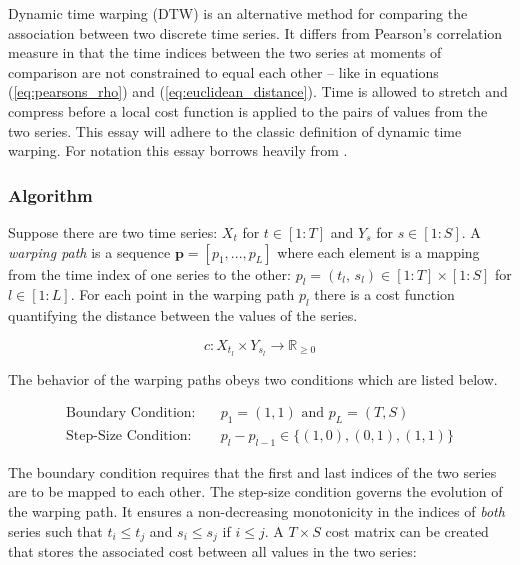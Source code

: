 Dynamic time warping (DTW) is an alternative method for comparing the association between two discrete time series. It differs from Pearson's correlation measure in that the time indices between the two series at moments of comparison are not constrained to equal each other -- like in equations (\ref{eq:pearsons_rho}) and (\ref{eq:euclidean_distance}). Time is allowed to stretch and compress before a local cost function is applied to the pairs of values from the two series. This essay will adhere to the classic definition of dynamic time warping. For notation this essay borrows heavily from \cite{Mueller2007}.

\subsubsection{Algorithm} \label{sec:DTW_Algorithm}

Suppose there are two time series: $X_{t}$ for $t \in [1:T]$ and $Y_{s}$ for $s \in [1:S]$. A \emph{warping path} is a sequence $\boldsymbol{p} = [p_{1},..., p_{L}]$ where each element is a mapping from the time index of one series to the other: $p_{l} = (t_{l}, \, s_{l}) \in [1:T] \times [1:S]$ for $l \in [1:L]$. For each point in the warping path $p_{l}$ there is a cost function quantifying the distance between the values of the series.

\begin{equation} \label{eq:local_cost_function}
    c: X_{t_{l}} \times Y_{s_{l}} \rightarrow \mathbb{R}_{\ge 0}
\end{equation}

The behavior of the warping paths obeys two conditions which are listed below.

\begin{align}
    \text{Boundary Condition:} \quad & p_{1} = (1, 1) \text{ and } p_{L} = (T, S) \\ 
    \text{Step-Size Condition:} \quad& p_{l} - p_{l - 1} \in \{ (1, 0), (0, 1), (1, 1) \} \label{eq:dtw_condition}
\end{align}

The boundary condition requires that the first and last indices of the two series are to be mapped to each other. The step-size condition governs the evolution of the warping path. It ensures a non-decreasing monotonicity in the indices of \emph{both} series such that $t_{i} \le t_{j}$ and $s_{i} \le s_{j}$ if $i \le j$. A $T \times S$ cost matrix can be created that stores the associated cost between all values in the two series:

